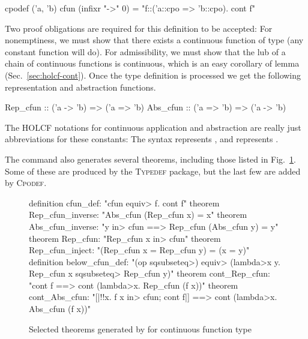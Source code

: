 \begin{isacode}
cpodef ('a, 'b) cfun (infixr "->" 0) = "{f::('a::cpo => 'b::cpo). cont f}"
\end{isacode}

\noindent
Two proof obligations are required for this definition to be accepted: For nonemptiness, we must show that there exists a continuous function of type  (any constant function will do). For admissibility, we must show that the lub of a chain of continuous functions is continuous, which is an easy corollary of lemma  (Sec.~\ref{sec:holcf-cont}). Once the type definition is processed we get the following representation and abstraction functions.

\begin{isacodes}
Rep_cfun :: ('a -> 'b) => ('a => 'b)
Abs_cfun :: ('a => 'b) => ('a -> 'b)
\end{isacodes}

\noindent
The HOLCF notations for continuous application and abstraction are really just abbreviations for these constants: The syntax  represents , and  represents .

The  command also generates several theorems, including those listed in Fig.~\ref{fig:holcf-cfun-cpodef}. Some of these are produced by the \textsc{Typedef} package, but the last few are added by \textsc{Cpodef}.

\begin{figure}
\begin{isabelle}
definition cfun_def: "cfun \<equiv> {f. cont f}"
theorem Rep_cfun_inverse: "Abs_cfun (Rep_cfun x) = x"
theorem Abs_cfun_inverse: "y \<in> cfun ==> Rep_cfun (Abs_cfun y) = y"
theorem Rep_cfun: "Rep_cfun x \<in> cfun"
theorem Rep_cfun_inject: "(Rep_cfun x = Rep_cfun y) = (x = y)"
definition below_cfun_def: "(op \<sqsubseteq>) \<equiv> (\<lambda>x y. Rep_cfun x \<sqsubseteq> Rep_cfun y)"
theorem cont_Rep_cfun: "cont f ==> cont (\<lambda>x. Rep_cfun (f x))"
theorem cont_Abs_cfun: "[|!!x. f x \<in> cfun; cont f|] ==> cont (\<lambda>x. Abs_cfun (f x))"
\end{isabelle}
\caption{Selected theorems generated by  for continuous function type}
\label{fig:holcf-cfun-cpodef}
\end{figure}

